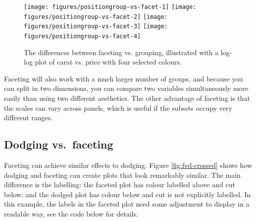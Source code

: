 \begin{figure}

{\centering \texttt{[image: figures/positiongroup-vs-facet-1]} \texttt{[image: figures/positiongroup-vs-facet-2]} \texttt{[image: figures/positiongroup-vs-facet-3]} \texttt{[image: figures/positiongroup-vs-facet-4]} 

}

\caption{The differences between faceting vs. grouping, illustrated with a log-log plot of carat vs. price with four selected colours.\label{fig:group-vs-facet}}
\end{figure}

Faceting will also work with a much larger number of groups, and because
you can split in two dimensions, you can compare two variables
simultaneously more easily than using two different aesthetics. The
other advantage of faceting is that the scales can vary across panels,
which is useful if the subsets occupy very different ranges.

\subsection{Dodging vs.~faceting}\label{sub:dodge-vs-facet}

Faceting can achieve similar effects to dodging. Figure
\ref{fig:fvd-crossed} shows how dodging and faceting can create plots
that look remarkably similar. The main difference is the labelling: the
faceted plot has colour labelled above and cut below; and the dodged
plot has colour below and cut is not explicitly labelled. In this
example, the labels in the faceted plot need some adjustment to display
in a readable way, see the code below for details.
 

\begin{Shaded}
\begin{Highlighting}[]
  \NormalTok{, } 
   \NormalTok{)}
  \NormalTok{, } \StringTok{ }
\StringTok{  }\StringTok{ }\StringTok{ }
\StringTok{  }\NormalTok{(} \NormalTok{(} \NormalTok{, } \NormalTok{, } \NormalTok{, }
    \NormalTok{))}
\end{Highlighting}
\end{Shaded}

